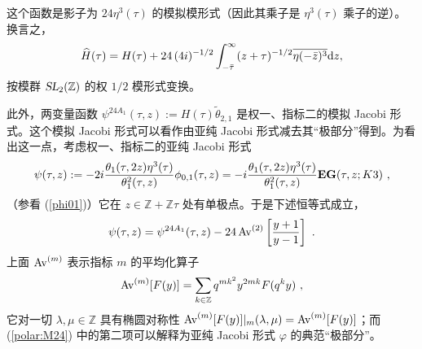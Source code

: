 \documentclass[11pt,a4paper,fontset=windows]{ctexart}
\numberwithin{equation}{section}
\newcommand{\SL}{\operatorname{\textsl{SL}}}      %
\newcommand{\ZZ}{\mathbb{Z}}
\def\l{\lambda}
\def\m{\mu}
\def\t{\tau}
\newcommand{\ex}{\operatorname{e}} %
\newcommand{\be}{\begin{equation}}
\newcommand{\ee}{\end{equation}}
\newcommand{\eq}[1]{(\ref{#1})}
\begin{document}
\begin{itemize}

这个函数是影子为 $24 \eta^3(\t)$ 的模拟模形式（因此其乘子是 $\eta^3(\t)$ 乘子的逆）。换言之，
\be\label{completion_H}
\widehat{H}(\t)=H(\t)+24\, (4{i})^{-1/2} \int_{-\bar \t}^{\infty}(z+\t)^{-1/2}\overline{\eta(-\bar z)^3}{\rm d}z,
\ee
按模群 $\SL_2(\ZZ)$ 的权 $1/2$ 模形式变换。


此外，两变量函数 $\psi^{24A_1}(\t,z):= H(\t) \tilde{\theta}_{2,1}$ 是权一、指标二的模拟 Jacobi 形式。这个模拟 Jacobi 形式可以看作由亚纯 Jacobi 形式减去其“极部分”得到。为看出这一点，考虑权一、指标二的亚纯 Jacobi 形式
\be\label{eq:psi_EGK3}
\psi(\t,z) := -2i{\theta_1(\t,2z)\eta^3(\t)\over \theta_1^2(\t,z)}\phi_{0,1}(\t,z)= -i {\theta_1(\t,2z)\eta^3(\t)\over \theta_1^2(\t,z)}{{ \bf EG}}(\t,z;K3)~,
\ee
（参看 (\ref{phi01})）它在 $z\in \ZZ + \ZZ \t$ 处有单极点。于是下述恒等式成立，
\be\label{polar:M24}
\psi(\t,z) =  \psi^{24A_1}(\t,z) -24\, {\rm Av}^{(2)}\left[{y+1\over y-1}\right]~. 
\ee
上面 ${\rm Av}^{(m)}$ 表示指标 $m$ 的平均化算子
 \[{\rm Av}^{(m)}[F(y)] = \sum_{k\in \ZZ} q^{mk^2}y^{2mk}F(q^ky)~,\] 
它对一切 ${\l,\m\in \ZZ}$ 具有椭圆对称性 ${\rm Av}^{(m)}[F(y)] \lvert_m(\l,\mu) ={\rm Av}^{(m)}[F(y)]  $；而 \eq{polar:M24} 中的第二项可以解释为亚纯 Jacobi 形式 $\varphi$ 的典范“极部分”。





\end{itemize}
\end{document}
